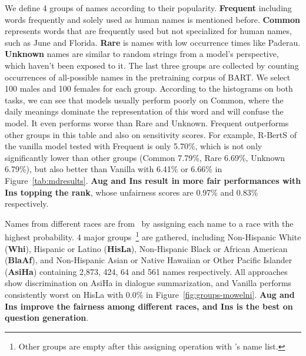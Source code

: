We define 4 groups of names according to their popularity. \textbf{Frequent} including words frequently and solely used as human names is mentioned before. \textbf{Common} represents words that are frequently used but not specialized for human names, such as June and Florida. \textbf{Rare} is names with low occurrence times like Paderau. \textbf{Unknown} names are similar to random strings from a model's perspective, which haven't been exposed to it. The last three groups are collected by counting occurrences
of all-possible names in the pretraining corpus of BART. We select 100 males and 100 females for each group. According to the histograms on both tasks, we can see that models usually perform poorly on Common, where the daily meanings dominate the representation of this word and will confuse the model. It even performs worse than Rare and Unknown.
Frequent outperforms other groups in this table and also on sensitivity scores. For example, R-BertS of the vanilla model tested with Frequent is only 5.70\%, which is not only significantly lower than other groups (Common 7.79\%, Rare 6.69\%, Unknown 6.79\%), but also better than Vanilla with 6.41\% or 6.66\% in Figure~\ref{tab:mdresults}. \textbf{Aug and Ins result in more fair performances with Ins topping the rank}, whose unfairness scores are 0.97\% and 0.83\% respectively.

Names from different races are from~\citet{tzioumis2018demographic} by assigning each name to a race with the highest probability. 4 major groups~\footnote{Other groups are empty after this assigning operation with \citet{tzioumis2018demographic}'s name list.} are gathered, including Non-Hispanic White (\textbf{Whi}), Hispanic or Latino (\textbf{HisLa}), Non-Hispanic Black or African American (\textbf{BlaAf}), and Non-Hispanic {Asian} or Native Hawaiian or Other Pacific Islander (\textbf{AsiHa}) containing 2,873, 424, 64 and 561 names respectively. All approaches show discrimination on AsiHa in dialogue summarization, and Vanilla performs consistently worst on HisLa with 0.0\% in Figure~\ref{fig:groups-mowelni}. \textbf{Aug and Ins improve the fairness among different races, and Ins is the best on question generation}. %




